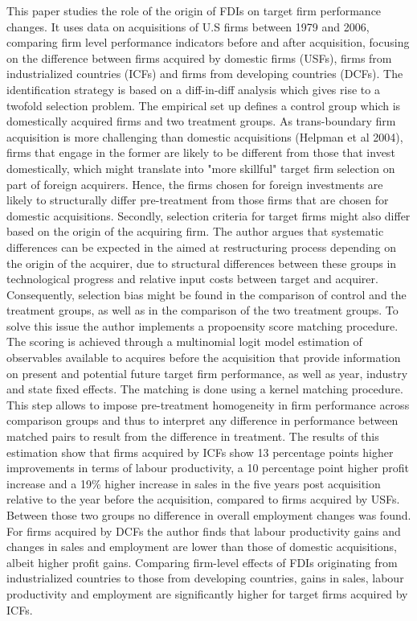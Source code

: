 \documentclass[11pt,a4paper,leqno]{article}
\begin{document}
This paper studies the role of the origin of FDIs on target firm performance changes. It uses data on acquisitions of U.S firms between 1979 and 2006, comparing firm level performance indicators before and after acquisition, focusing on the difference between firms acquired by domestic firms (USFs), firms from industrialized countries (ICFs) and firms from developing countries (DCFs). The identification strategy is based on a diff-in-diff analysis which gives rise to a twofold selection problem. The empirical set up defines a control group which is domestically acquired firms and two treatment groups. As trans-boundary firm acquisition is more challenging than domestic acquisitions (Helpman et al 2004), firms that engage in the former are likely to be different from those that invest domestically, which might translate into "more skillful" target firm selection on part of foreign acquirers. Hence, the firms chosen for foreign investments are likely to structurally differ pre-treatment from those firms that are chosen for domestic acquisitions. Secondly, selection criteria for target firms might also differ based on the origin of the acquiring firm. The author argues that systematic differences can be expected in the aimed at restructuring process depending on the origin of the acquirer, due to structural differences between these groups in technological progress and relative input costs between target and acquirer. Consequently, selection bias might be found in the comparison of control and the treatment groups, as well as in the comparison of the two treatment groups. To solve this issue the author implements a propoensity score matching procedure. The scoring is achieved through a multinomial logit model estimation of observables available to acquires before the acquisition that provide information on present and potential future target firm performance, as well as year, industry and state fixed effects. The matching is done using a kernel matching procedure. This step allows to impose pre-treatment homogeneity in firm performance across comparison groups and thus to interpret any difference in performance between matched pairs to result from the difference in treatment. The results of this estimation show that firms acquired by ICFs show 13 percentage points higher improvements in terms of labour productivity, a 10 percentage point higher profit increase and a 19\% higher increase in sales in the five years post acquisition relative to the year before the acquisition, compared to firms acquired by USFs. Between those two groups no difference in overall employment changes was found. For firms acquired by DCFs the author finds that labour productivity gains and changes in sales and employment are lower than those of domestic acquisitions, albeit higher profit gains. Comparing firm-level effects of FDIs originating from industrialized countries to those from developing countries, gains in sales, labour productivity and employment are significantly higher for target firms acquired by ICFs.
\end{document}
